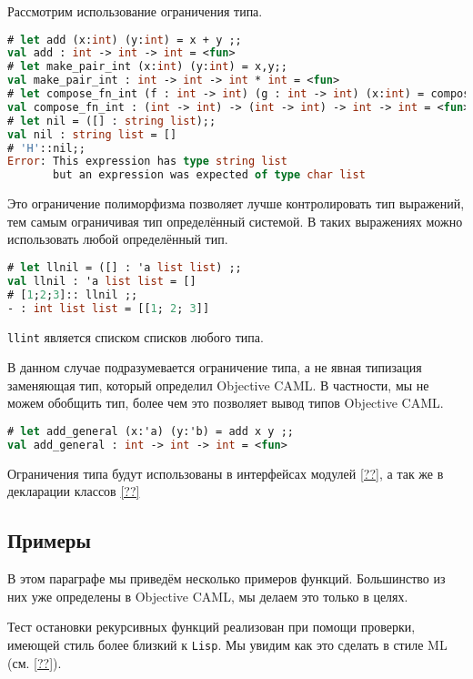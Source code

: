 Рассмотрим использование ограничения типа.

\begin{lstlisting}[language=OCaml]
# let add (x:int) (y:int) = x + y ;;
val add : int -> int -> int = <fun>
# let make_pair_int (x:int) (y:int) = x,y;;
val make_pair_int : int -> int -> int * int = <fun>
# let compose_fn_int (f : int -> int) (g : int -> int) (x:int) = compose f g x;;
val compose_fn_int : (int -> int) -> (int -> int) -> int -> int = <fun>
# let nil = ([] : string list);;
val nil : string list = []
# 'H'::nil;;
Error: This expression has type string list
       but an expression was expected of type char list
\end{lstlisting}

Это ограничение полиморфизма позволяет лучше контролировать тип выражений, тем
самым ограничивая тип определённый системой. В таких выражениях можно
использовать любой определённый тип.

\begin{lstlisting}[language=OCaml]
# let llnil = ([] : 'a list list) ;;
val llnil : 'a list list = []
# [1;2;3]:: llnil ;;
- : int list list = [[1; 2; 3]]
\end{lstlisting}

\texttt{llint} является списком списков любого типа.

В данном случае подразумевается ограничение типа, а не явная типизация
заменяющая тип, который определил Objective CAML. В частности, мы не можем
обобщить тип, более чем это позволяет вывод типов Objective CAML.

\begin{lstlisting}[language=OCaml]
# let add_general (x:'a) (y:'b) = add x y ;;
val add_general : int -> int -> int = <fun>
\end{lstlisting}

Ограничения типа будут использованы в интерфейсах модулей \ref{??}, а так же в
декларации классов \ref{??}

\subsection{Примеры}

В этом параграфе мы приведём несколько примеров функций. Большинство из них уже
определены в Objective CAML, мы делаем это только в  целях.

Тест остановки рекурсивных функций реализован при помощи проверки, имеющей стиль
более близкий к \texttt{Lisp}. Мы увидим как это сделать в стиле ML (см.
\ref{??}).

